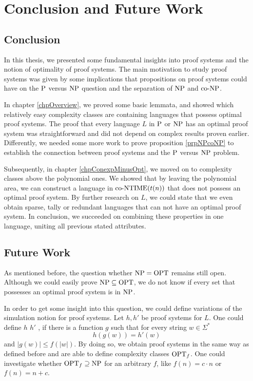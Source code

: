 \chapter{Conclusion and Future Work}
  
  \section{Conclusion}
  
  In this thesis, we presented some fundamental insights into proof systems and the notion of optimality of proof systems. The main motivation to study proof systems was given by some implications that propositions on proof systems could have on the \(\P\) versus \(\NP\) question and the separation of \(\NP\) and \(\coNP\).
  
  In chapter \ref{chpOverview}, we proved some basic lemmata, and showed which relatively easy complexity classes are containing languages that possess optimal proof systems. The proof that every language \(L\) in \(\P\) or \(\NP\) has an optimal proof system was straightforward and did not depend on complex results proven earlier. Differently, we needed some more work to prove proposition \ref{prpNPcoNP} to establish the connection between proof systems and the \(\P\) versus \(\NP\) problem.
  
  Subsequently, in chapter \ref{chpConexpMinusOpt}, we moved on to complexity classes above the polynomial ones. We showed that by leaving the polynomial area, we can construct a language in \(\coNTIME(t(n))\) that does not possess an optimal proof system. By further research on \(L\), we could state that we even obtain sparse, tally or redundant languages that can not have an optimal proof system. In conclusion, we succeeded on combining these properties in one language, uniting all previous stated attributes.
  
  \section{Future Work}

  As mentioned before, the question whether \(\NP = \OPT\) remains still open. Although we could easily prove \(\NP \subseteq \OPT\), we do not know if every set that possesses an optimal proof system is in \(\NP\).
  
  In order to get some insight into this question, we could define variations of the simulation notion for proof systems. Let \(h, h'\) be proof systems for \(L\). One could define \(h\)  \(h'\) , if there is a function \(g\) such that for every string \(w \in \Sigma^*\)
  \[
    h(g(w)) = h'(w)
  \]
  and \(|g(w)| \leq f(|w|)\). By doing so, we obtain  proof systems in the same way as defined before and are able to define complexity classes \(\OPT_f\). One could investigate whether \(\OPT_f \supseteq \NP\) for an arbitrary \(f\), like \(f(n) = c \cdot n\) or \(f(n) = n + c\).